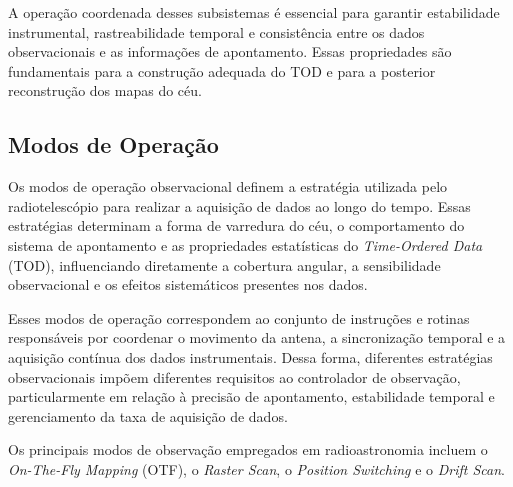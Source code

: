 A operação coordenada desses subsistemas é essencial para garantir estabilidade instrumental, rastreabilidade temporal e consistência entre os dados observacionais e as informações de apontamento. Essas propriedades são fundamentais para a construção adequada do TOD e para a posterior reconstrução dos mapas do céu.

\subsection{Modos de Operação}

Os modos de operação observacional definem a estratégia utilizada pelo radiotelescópio para realizar a aquisição de dados ao longo do tempo. Essas estratégias determinam a forma de varredura do céu, o comportamento do sistema de apontamento e as propriedades estatísticas do \textit{Time-Ordered Data} (TOD), influenciando diretamente a cobertura angular, a sensibilidade observacional e os efeitos sistemáticos presentes nos dados.

Esses modos de operação correspondem ao conjunto de instruções e rotinas responsáveis por coordenar o movimento da antena, a sincronização temporal e a aquisição contínua dos dados instrumentais. Dessa forma, diferentes estratégias observacionais impõem diferentes requisitos ao controlador de observação, particularmente em relação à precisão de apontamento, estabilidade temporal e gerenciamento da taxa de aquisição de dados.

Os principais modos de observação empregados em radioastronomia incluem o \textit{On-The-Fly Mapping} (OTF), o \textit{Raster Scan}, o \textit{Position Switching} e o \textit{Drift Scan}.


